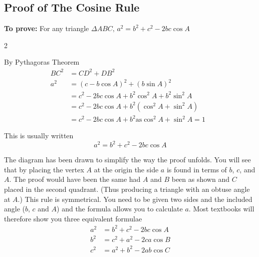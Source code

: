 \subsection{Proof of The Cosine Rule}
\textbf{To prove:} For any triangle $ \Delta A B C\text{,}$ $a^{2} =b^{2} +c^{2} -2 b c \cos  A$  
\columnsep =30pt
\begin {multicols}{2}
 

\vspace{2cm}
\setlength\fboxrule{0in}\setlength\fboxsep{0.2in}
By Pythagoras Theorem
\begin{align*}B C^{2} &  = C D^{2} +D B^{2} \\
a^{2} &  = \left (c -b \cos  A\right )^{2} +\left (b \sin  A\right )^{2} \\
 &  = c^{2} -2 b c \cos  A +b^{2} \cos ^{2} A +b^{2} \sin ^{2} A \\
 &  = c^{2} -2 b c \cos  A +b^{2} \left (\cos ^{2} A +\sin ^{2} A\right ) \\
 &  = c^{2} -2 b c \cos  A +b^{2}\text{as}\cos ^{2} A +\sin ^{2} A =1\text{\ }\end{align*} 
\end {multicols}
 

This is usually written
\begin{equation*}a^{2} =b^{2} +c^{2} -2 b c \cos  A
\end{equation*}

The diagram has been drawn to simplify the way the proof unfolds. You
will see that by placing the vertex $A$ at the origin the side $a$ is found in terms of $b$, $c$, and $A$. The proof would have been the same had $A$ and $B$ been as shown and $C$ placed in the second quadrant. (Thus producing a triangle with an obtuse angle at
$A$.) This rule is symmetrical. You need
to be given two sides and the included angle ($b$, $c$ and $A$) and the formula allows you to calculate $a$. Most textbooks will therefore show you three equivalent formulae
\begin{align*}a^{2} &  = b^{2} +c^{2} -2 b c \cos  A \\
b^{2} &  = c^{2} +a^{2} -2 c a \cos  B \\
c^{2} &  = a^{2} +b^{2} -2 a b \cos  C\end{align*}

